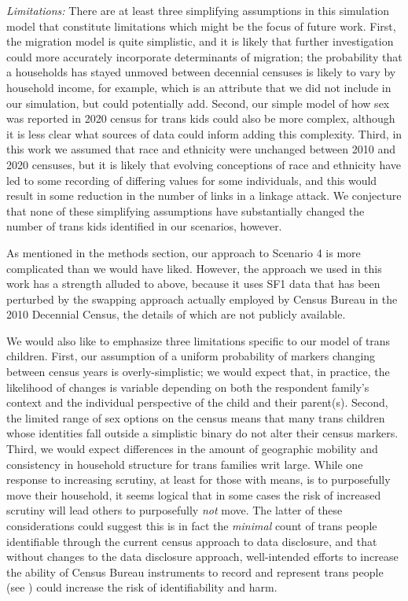 \documentclass{jpc} %
\theoremstyle{plain}\newtheorem{satz}[thm]{Satz} %
\begin{document}
\emph{Limitations:}
There are at least three simplifying assumptions in this simulation model that constitute limitations which might be the focus of future work.  First, the migration model is quite simplistic, and it is likely that further investigation could more accurately incorporate determinants of migration; the probability that a households has stayed unmoved between decennial censuses is likely to vary by household income, for example, which is an attribute that we did not include in our simulation, but could potentially add.
Second, our simple model of how sex was reported in 2020 census for trans kids could also be more complex, although it is less clear what sources of data could inform adding this complexity. Third, in this work we assumed that race and ethnicity were unchanged between 2010 and 2020 censuses, but it is likely that evolving conceptions of race and ethnicity have led to some recording of differing values for some individuals, and this would result in some reduction in the number of links in a linkage attack.  We conjecture that none of these simplifying assumptions have substantially changed the number of trans kids identified in our scenarios, however.

As mentioned in the methods section, our approach to Scenario 4 is more complicated than we would have liked.  However, the approach we used in this work has a strength alluded to above, because it uses SF1 data that has been perturbed by the swapping approach actually employed by Census Bureau in the 2010 Decennial Census, the details of which are not publicly available.

We would also like to emphasize three limitations specific to our model of trans children. First, our assumption of a uniform probability of markers changing between census years is overly-simplistic; we would expect that, in practice, the likelihood of changes is variable depending on both the respondent family's context and the individual perspective of the child and their parent(s). Second, the limited range of sex options on the census means that many trans children whose identities fall outside a simplistic binary do not alter their census markers. Third, we would expect differences in the amount of geographic mobility and consistency in household structure for trans families writ large. While one response to increasing scrutiny, at least for those with means, is to purposefully move their household, it seems logical that in some cases the risk of increased scrutiny will lead others to purposefully \emph{not} move. The latter of these considerations could  suggest this is in fact the \textit{minimal} count of trans people identifiable through the current census approach to data disclosure, and that without changes to the data disclosure approach, well-intended efforts to increase the ability of Census Bureau instruments to record and represent trans people (see \cite{whfactsheet}) could  increase the risk of identifiability and harm.
\end{document}
